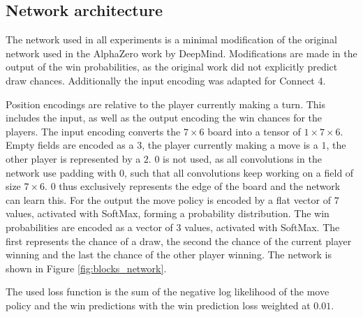 \documentclass[12pt,onecolumn,oneside,titlepage]{article}
\begin{document}
\subsection{Network architecture}

The network used in all experiments is a minimal modification of the original network used in the AlphaZero work by DeepMind. Modifications are made in the output of the win probabilities, as the original work did not explicitly predict draw chances. Additionally the 
input encoding was adapted for Connect 4.

Position encodings are relative to the player currently making a turn. This includes the input, as well as the output encoding the win chances for the players.
The input encoding converts the $7\times6$ board into a tensor of $1\times7\times6$. Empty fields are encoded as a $3$, the player currently making a move is a $1$, the other player is represented by a $2$. $0$ is not used, as all convolutions 
in the network use padding with $0$, such that all convolutions keep working on a field of size $7\times6$. $0$ thus exclusively represents the edge of the board and the network can learn this.
For the output the move policy is encoded by a flat vector of $7$ values, activated with SoftMax, forming a probability distribution. The win probabilities are encoded as a vector of $3$ values, activated with SoftMax. The first represents the chance of a draw, the second the chance of the
current player winning and the last the chance of the other player winning. The network is shown in Figure \ref{fig:blocks_network}.

The used loss function is the sum of the negative log likelihood of the move policy and the win predictions with the win prediction loss weighted at $0.01$. 
\end{document}

